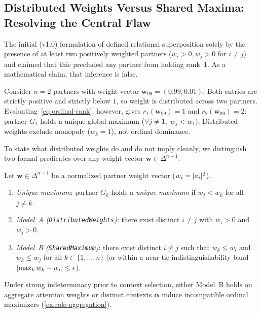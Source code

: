 \subsection{Distributed Weights Versus Shared Maxima: Resolving the Central Flaw}
\label{subsec:fw-superposition}

The initial (v1.0) formulation of \RST{} defined relational superposition solely by the
presence of at least two positively weighted partners ($w_i > 0, w_j > 0$ for $i \neq j$)
and claimed that this precluded any partner from holding rank~$1$. As a mathematical claim,
that inference is false.

\begin{example}[The $\mathbf{w} = (0.99, 0.01)$ counterexample; \layerformal]
\label{ex:w99-counterexample}
Consider $n = 2$ partners with weight vector $\mathbf{w}_{99} = (0.99, 0.01)$. Both entries
are strictly positive and strictly below $1$, so weight is distributed across two partners.
Evaluating~\eqref{eq:ordinal-rank}, however, gives $r_1(\mathbf{w}_{99}) = 1$ and
$r_2(\mathbf{w}_{99}) = 2$: partner $G_1$ holds a unique global maximum ($\forall j \neq 1,\;
w_j < w_1$). Distributed weights exclude monopoly ($w_k = 1$), not ordinal dominance.
\end{example}

To state what distributed weights do and do not imply cleanly, we distinguish two formal
predicates over any weight vector $\mathbf{w} \in \Delta^{n-1}$:

\begin{definition}
\label{def:superposition}
Let $\mathbf{w} \in \Delta^{n-1}$ be a normalized partner weight vector ($w_i = \lvert a_i \rvert^2$).
\begin{enumerate}[nosep]
  \item \emph{Unique maximum}: partner $G_k$ holds a \emph{unique maximum} if
        $w_j < w_k$ for all $j \neq k$.
  \item \emph{Model~A (\textnormal{\texttt{DistributedWeights}})}: there exist distinct
        $i \neq j$ with $w_i > 0$ and $w_j > 0$.
  \item \emph{Model~B (\textnormal{\texttt{SharedMaximum}})}: there exist distinct
        $i \neq j$ such that $w_k \le w_i$ and $w_k \le w_j$ for all $k \in \{1, \dots, n\}$
        (or within a near-tie indistinguishability band $\lvert \max_k w_k - w_i \rvert \le \epsilon$).
\end{enumerate}
Under strong \RST{} indeterminacy prior to context selection, either Model~B holds on
aggregate attention weights or distinct contexts $\boldsymbol{\alpha}$ induce incompatible
ordinal maximizers (\cref{ex:role-aggregation}).
\end{definition}

